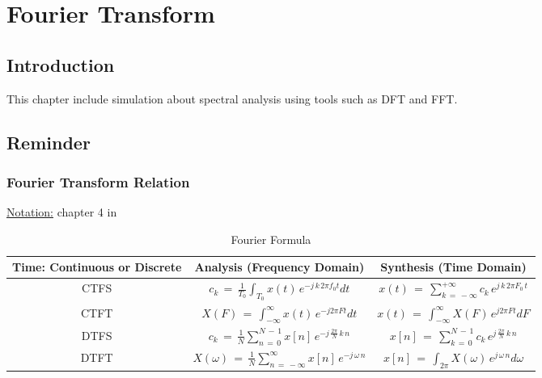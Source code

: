 

\chapter{Fourier Transform}

\section{Introduction}

This chapter include simulation about spectral analysis using tools such as DFT and FFT.

\section{Reminder}

\subsection{Fourier Transform Relation}

\underline{Notation:} chapter 4 in \cite{DSP_DimitrisManolakis}

\begin{table}[!h]
	\centering
\begin{tabular}{|c|c|c|} \hline

Time: Continuous or Discrete & Analysis (Frequency Domain) & Synthesis (Time Domain) \\ \hline
CTFS & $c_k \, = \, \displaystyle\frac{1}{T_0} \displaystyle\int_{T_0} x(t) \, e^{-j  \, k \, 2 \pi f_0 t} dt$ 	& $x(t) \, = \, \displaystyle\sum_{k \, = \, - \infty}^{+ \infty} c_k \, e^{j \, k \, 2 \pi F_0 \, t}$   \\ \hline
CTFT & $X(F) \, = \, \displaystyle\int_{-\infty}^\infty x(t) \, e^{-j 2\pi F t} dt $	& $x(t) \, = \, \displaystyle\int_{-\infty}^\infty X(F) \, e^{j 2\pi F t} dF $ \\ \hline
DTFS    & $c_k \, = \, \displaystyle\frac{1}{N} \displaystyle\sum_{n \, = \, 0}^{N \, - \, 1} x[n] \, e^{-j  \, \frac{2 \pi}{N} \, k \,n} $ & $x[n] \, = \, \displaystyle\sum_{k \, = \, 0}^{N \, - \, 1} c_k \, e^{j  \, \frac{2 \pi}{N} \, k \,n}$ \\ \hline
DTFT    & $X(\omega) \, = \, \displaystyle\frac{1}{N} \displaystyle\sum_{n \, = \, - \infty}^{\infty} x[n] \, e^{-j  \, \omega \,n} $ & $x[n] \, = \, \displaystyle\int_{2 \pi} X(\omega) \, e^{j  \, \omega \,n} d \omega$ \\ \hline
\end{tabular}
\caption{Fourier Formula}
\label{Tb:Fourier_Processing:Fourier_Relation}
\end{table} 


